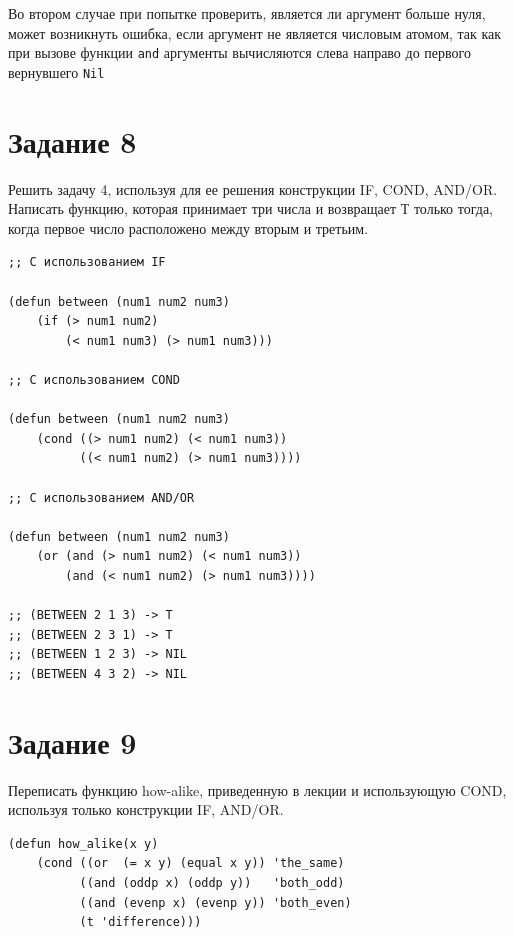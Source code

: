 \documentclass[a4paper,14pt, unknownkeysallowed]{extreport}
\begin{document}
Во втором случае при попытке проверить, является ли аргумент больше нуля, может возникнуть ошибка, если аргумент не является числовым атомом, так как при вызове функции \texttt{and} аргументы вычисляются слева направо до первого вернувшего \texttt{Nil}


\section{Задание 8}

Решить задачу 4, используя для ее решения конструкции IF, COND, AND/OR. Написать функцию, которая принимает три числа и возвращает Т только тогда, когда первое число расположено между вторым и третьим.

\begin{center}
\captionsetup{justification=raggedright,singlelinecheck=off}
\begin{lstlisting}[label=lst:parallel_processing,caption=Решение задания 8]
;; С использованием IF

(defun between (num1 num2 num3)
	(if (> num1 num2) 
		(< num1 num3) (> num1 num3)))

;; С использованием COND

(defun between (num1 num2 num3)
	(cond ((> num1 num2) (< num1 num3))
		  ((< num1 num2) (> num1 num3))))

;; С использованием AND/OR

(defun between (num1 num2 num3)
	(or (and (> num1 num2) (< num1 num3))
		(and (< num1 num2) (> num1 num3))))

;; (BETWEEN 2 1 3) -> T
;; (BETWEEN 2 3 1) -> T
;; (BETWEEN 1 2 3) -> NIL
;; (BETWEEN 4 3 2) -> NIL
\end{lstlisting}
\end{center}

\section{Задание 9}

Переписать функцию how-alike, приведенную в лекции и использующую COND, используя только конструкции IF, AND/OR.

\begin{center}
\captionsetup{justification=raggedright,singlelinecheck=off}
\begin{lstlisting}[label=lst:parallel_processing,caption=Функция how-alike из лекции]
(defun how_alike(x y)
    (cond ((or  (= x y) (equal x y)) 'the_same)
          ((and (oddp x) (oddp y))   'both_odd) 
          ((and (evenp x) (evenp y)) 'both_even) 
          (t 'difference)))
\end{lstlisting}
\end{center}
\end{document}
